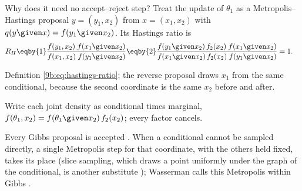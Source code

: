 Why does it need no accept--reject step? Treat the update of $\theta_1$ as a Metropolis--Hastings
proposal $y=(y_1,x_2)$ from $x=(x_1,x_2)$ with $q(y\given x)=f(y_1\given x_2)$. Its Hastings ratio
is
\begin{align}
  R_H
  &\eqby{1}\frac{f(y_1,x_2)\;f(x_1\given x_2)}{f(x_1,x_2)\;f(y_1\given x_2)}
   \eqby{2}\frac{f(y_1\given x_2)\,f_2(x_2)\;f(x_1\given x_2)}
               {f(x_1\given x_2)\,f_2(x_2)\;f(y_1\given x_2)}
   =1 .
  \label{9b:eq:gibbs-ratio}
\end{align}
\begin{explain}
  \item Definition \eqref{9b:eq:hastings-ratio}; the reverse proposal draws $x_1$ from the same
        conditional, because the second coordinate is the same $x_2$ before and after.
  \item Write each joint density as conditional times marginal, $f(\theta_1,x_2)=
        f(\theta_1\given x_2)\,f_2(x_2)$; every factor cancels.
\end{explain}
Every Gibbs proposal is accepted . When a conditional cannot be
sampled directly, a single Metropolis step for that coordinate, with the others held fixed, takes
its place (slice sampling, which draws a point uniformly under the graph of the conditional, is
another substitute ); Wasserman calls this Metropolis within Gibbs .

